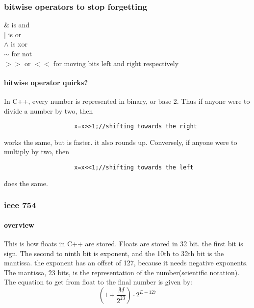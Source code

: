 \documentclass{article} %
\theoremstyle{theorem}
\theoremstyle{definition}
\begin{document}
        \subsubsection{bitwise operators to stop forgetting}
            \begin{center}
                \& is and\\$|$ is or\\$\wedge$ is xor\\$\sim$ for not\\$>>$ or $<<$ for moving bits left and right respectively
            \end{center}
            \paragraph{bitwise operator quirks?}
                In C++, every number is represented in binary, or base 2. Thus if anyone were to divide a number by two, then
                \begin{verbatim}
                    x=x>>1;//shifting towards the right
                \end{verbatim}
                works the same, but is faster. it also rounds up. Conversely, if anyone were to multiply by two, then 
                \begin{verbatim}
                    x=x<<1;//shifting towards the left
                \end{verbatim}
                does the same.
        \subsubsection{ieee 754}
            \paragraph{overview}
                This is how floats in C++ are stored. Floats are stored in 32 bit. the first bit is sign.
                The second to ninth bit is exponent, and the 10th to 32th bit is the mantissa. the exponent has
                an offset of 127, because it needs negative exponents. The mantissa, 23 bits, is the representation of the number(scientific notation).
                The equation to get from float to the final number is given by:
                \begin{equation}
                    (1+\dfrac{M}{2^{23}})\cdot2^{E-127}
                \end{equation}
\end{document}
